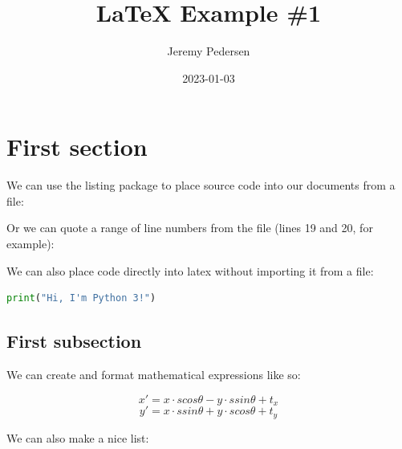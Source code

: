 \documentclass[a4paper,12pt]{article} %
\title{\LaTeX \space{} Example \#1}
\author{Jeremy Pedersen}
\date{2023-01-03} %
\begin{document}
\maketitle %

\section{First section} %

We can use the listing package to place source code into our documents from a file:

\vspace{5mm}

\vspace{5mm}

\noindent
Or we can quote a range of line numbers from the file (lines 19 and 20, for example):

\vspace{5mm}

\vspace{5mm}

\clearpage

\noindent
We can also place code directly into latex without importing it from a file:

\vspace{5mm}
\begin{lstlisting}[language=Python]
print("Hi, I'm Python 3!")
\end{lstlisting}
\vspace{5mm}

\subsection{First subsection} %

We can create and format mathematical expressions like so:

\vspace{2mm}
$$x' = x \cdot s cos \theta - y \cdot s sin \theta + t_x$$
$$y' = x \cdot s sin \theta + y \cdot s cos \theta + t_y$$
\vspace{2mm}

\noindent
We can also make a nice list:
\end{document}
